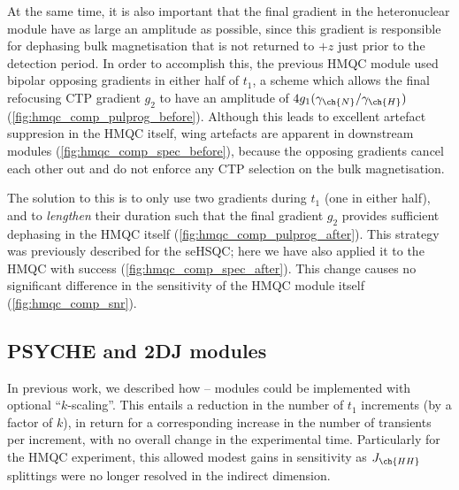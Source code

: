 \documentclass[a4paper,11pt]{article}
\newcommand{\proton}{\ch{^{1}H}}
\newcommand{\nitrogen}{\ch{^{15}N}}
\newcommand{\HN}{\proton{}--\nitrogen{}}
\begin{document}
\begin{refsection}
At the same time, it is also important that the final gradient in the heteronuclear module have as large an amplitude as possible, since this gradient is responsible for dephasing bulk magnetisation that is not returned to \(+z\) just prior to the detection period.
In order to accomplish this, the previous \nitrogen{} HMQC module used bipolar opposing gradients in either half of \(t_1\), a scheme which allows the final refocusing CTP gradient \(g_2\) to have an amplitude of \(4g_1(\gamma_{\ch{N}} / \gamma_{\ch{H}})\) (\cref{fig:hmqc_comp_pulprog_before}).
Although this leads to excellent artefact suppresion in the \nitrogen{} HMQC itself, wing artefacts are apparent in downstream modules (\cref{fig:hmqc_comp_spec_before}), because the opposing gradients cancel each other out and do not enforce any CTP selection on the bulk magnetisation.

The solution to this is to only use two gradients during \(t_1\) (one in either half), and to \textit{lengthen} their duration such that the final gradient \(g_2\) provides sufficient dephasing in the HMQC itself (\cref{fig:hmqc_comp_pulprog_after}).
This strategy was previously described for the \nitrogen{} seHSQC;\autocite{Yong2021JMR} here we have also applied it to the HMQC with success (\cref{fig:hmqc_comp_spec_after}).
This change causes no significant difference in the sensitivity of the HMQC module itself (\cref{fig:hmqc_comp_snr}).

\subsection{PSYCHE and 2DJ modules}

In previous work,\autocite{Yong2021JMR} we described how \HN{} modules could be implemented with optional ``\(k\)-scaling''.\autocite{PerezTrujillo2007MRC}
This entails a reduction in the number of \(t_1\) increments (by a factor of \(k\)), in return for a corresponding increase in the number of transients per increment, with no overall change in the experimental time.
Particularly for the HMQC experiment, this allowed modest gains in sensitivity as \(J_{\ch{HH}}\) splittings were no longer resolved in the indirect dimension.


\end{refsection}
\end{document}

